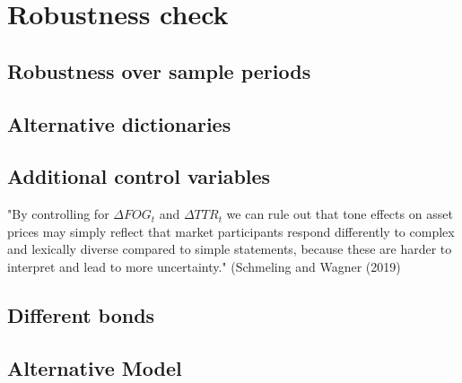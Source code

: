 \section{Robustness check}

\subsection{Robustness over sample periods}

\subsection{Alternative dictionaries}

\subsection{Additional control variables}

"By controlling for $\Delta FOG_{t}$ and $\Delta TTR_{t}$ we can rule out that tone effects on asset prices may simply reflect that market participants respond differently to complex and lexically diverse compared to simple statements, because these are harder to interpret and lead to more uncertainty." (Schmeling and Wagner (2019)

\subsection{Different bonds}

\subsection{Alternative Model}